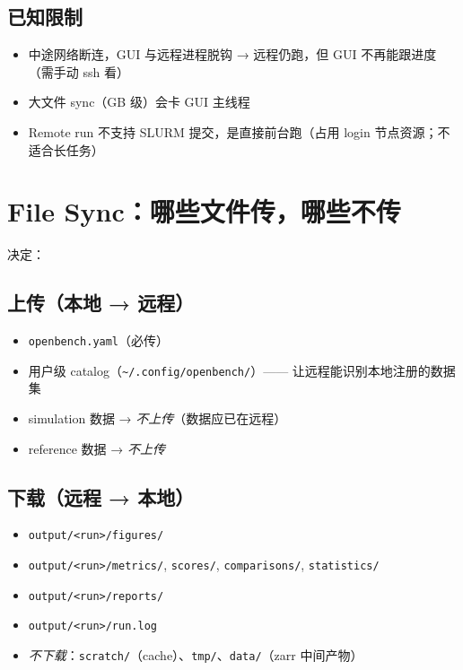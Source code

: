 \subsection{已知限制}

\begin{itemize}
  \item 中途网络断连，GUI 与远程进程脱钩 → 远程仍跑，但 GUI 不再能跟进度（需手动 ssh 看）
  \item 大文件 sync（GB 级）会卡 GUI 主线程
  \item Remote run 不支持 SLURM 提交，是直接前台跑（占用 login 节点资源；不适合长任务）
\end{itemize}

\section{File Sync：哪些文件传，哪些不传}

 决定：

\subsection{上传（本地 → 远程）}

\begin{itemize}
  \item \texttt{openbench.yaml}（必传）
  \item 用户级 catalog（\texttt{\~{}/.config/openbench/}）—— 让远程能识别本地注册的数据集
  \item simulation 数据 → \emph{不上传}（数据应已在远程）
  \item reference 数据 → \emph{不上传}
\end{itemize}

\subsection{下载（远程 → 本地）}

\begin{itemize}
  \item \texttt{output/<run>/figures/}
  \item \texttt{output/<run>/metrics/}, \texttt{scores/}, \texttt{comparisons/}, \texttt{statistics/}
  \item \texttt{output/<run>/reports/}
  \item \texttt{output/<run>/run.log}
  \item \emph{不下载}：\texttt{scratch/}（cache）、\texttt{tmp/}、\texttt{data/}（zarr 中间产物）
\end{itemize}

